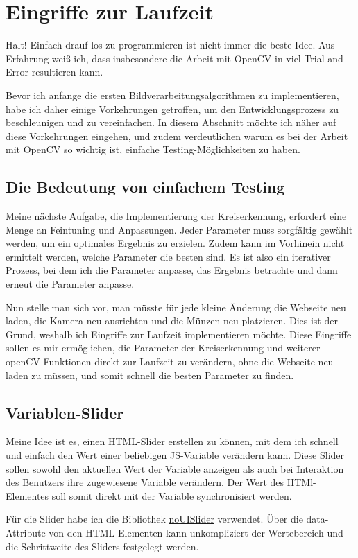 \section{Eingriffe zur Laufzeit}
Halt! Einfach drauf los zu programmieren ist nicht immer die beste Idee. Aus Erfahrung weiß ich, dass insbesondere die Arbeit mit OpenCV in viel Trial and Error resultieren kann. 

Bevor ich anfange die ersten Bildverarbeitungsalgorithmen zu implementieren, habe ich daher einige Vorkehrungen getroffen, um den Entwicklungsprozess zu beschleunigen und zu vereinfachen. In diesem Abschnitt möchte ich näher auf diese Vorkehrungen eingehen, und zudem verdeutlichen warum es bei der Arbeit mit OpenCV so wichtig ist, einfache Testing-Möglichkeiten zu haben.

\subsection{Die Bedeutung von einfachem Testing}
Meine nächste Aufgabe, die Implementierung der Kreiserkennung, erfordert eine Menge an Feintuning und Anpassungen. Jeder Parameter muss sorgfältig gewählt werden, um ein optimales Ergebnis zu erzielen. Zudem kann im Vorhinein nicht ermittelt werden, welche Parameter die besten sind. Es ist also ein iterativer Prozess, bei dem ich die Parameter anpasse, das Ergebnis betrachte und dann erneut die Parameter anpasse.

Nun stelle man sich vor, man müsste für jede kleine Änderung die Webseite neu laden, die Kamera neu ausrichten und die Münzen neu platzieren. Dies ist der Grund, weshalb ich Eingriffe zur Laufzeit implementieren möchte. Diese Eingriffe sollen es mir ermöglichen, die Parameter der Kreiserkennung und weiterer openCV Funktionen direkt zur Laufzeit zu verändern, ohne die Webseite neu laden zu müssen, und somit schnell die besten Parameter zu finden.

\subsection{Variablen-Slider}
Meine Idee ist es, einen HTML-Slider erstellen zu können, mit dem ich schnell und einfach den Wert einer beliebigen JS-Variable verändern kann. Diese Slider sollen sowohl den aktuellen Wert der Variable anzeigen als auch bei Interaktion des Benutzers ihre zugewiesene Variable verändern. Der Wert des HTMl-Elementes soll somit direkt mit der Variable synchronisiert werden.

Für die Slider habe ich die Bibliothek \href{https://refreshless.com/nouislider/}{noUISlider} verwendet.  Über die data-Attribute von den HTML-Elementen kann unkompliziert der Wertebereich und die Schrittweite des Sliders festgelegt werden.

